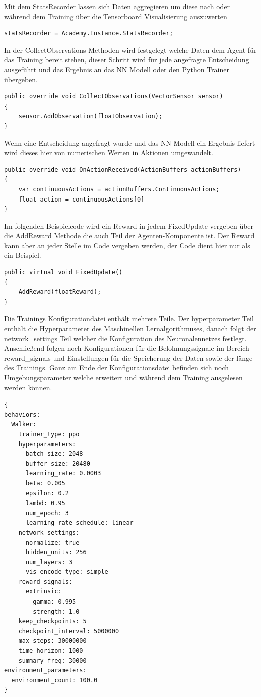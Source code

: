 Mit dem StatsRecorder lassen sich Daten aggregieren um diese nach oder während dem Training über die Tensorboard Visualisierung auszuwerten
\begin{lstlisting}
statsRecorder = Academy.Instance.StatsRecorder;
\end{lstlisting}

In der CollectObservations Methoden wird festgelegt welche Daten dem Agent für das Training bereit stehen, dieser Schritt wird für jede angefragte Entscheidung ausgeführt und das Ergebnis an das NN Modell oder den Python Trainer übergeben.
\begin{lstlisting}
public override void CollectObservations(VectorSensor sensor)
{
    sensor.AddObservation(floatObservation);
}
\end{lstlisting}

Wenn eine Entscheidung angefragt wurde und das NN Modell ein Ergebnis liefert wird dieses hier von numerischen Werten in Aktionen umgewandelt.
\begin{lstlisting}
public override void OnActionReceived(ActionBuffers actionBuffers)
{
    var continuousActions = actionBuffers.ContinuousActions;
    float action = continuousActions[0]
}
\end{lstlisting}

Im folgenden Beispielcode wird ein Reward in jedem FixedUpdate vergeben über die AddReward Methode die auch Teil der Agenten-Komponente ist. Der Reward kann aber an jeder Stelle im Code vergeben werden, der Code dient hier nur als ein Beispiel.
\begin{lstlisting}
public virtual void FixedUpdate()
{
    AddReward(floatReward);
}
\end{lstlisting}

Die Trainings Konfigurationdatei enthält mehrere Teile. Der hyperparameter Teil enthält die Hyperparameter des Maschinellen Lernalgorithmuses, danach folgt der network\_settings Teil welcher die Konfiguration des Neuronalennetzes festlegt. Anschließend folgen noch Konfigurationen für die Belohnungssignale im Bereich reward\_signals und Einstellungen für die Speicherung der Daten sowie der länge des Trainings. Ganz am Ende der Konfigurationsdatei befinden sich noch Umgebungsparameter welche erweitert und während dem Training ausgelesen werden können.
\begin{lstlisting}
{
behaviors:
  Walker:
    trainer_type: ppo
    hyperparameters:
      batch_size: 2048
      buffer_size: 20480
      learning_rate: 0.0003
      beta: 0.005
      epsilon: 0.2
      lambd: 0.95
      num_epoch: 3
      learning_rate_schedule: linear
    network_settings:
      normalize: true
      hidden_units: 256
      num_layers: 3
      vis_encode_type: simple
    reward_signals:
      extrinsic:
        gamma: 0.995
        strength: 1.0
    keep_checkpoints: 5
    checkpoint_interval: 5000000
    max_steps: 30000000
    time_horizon: 1000
    summary_freq: 30000
environment_parameters:
  environment_count: 100.0
}
\end{lstlisting}
